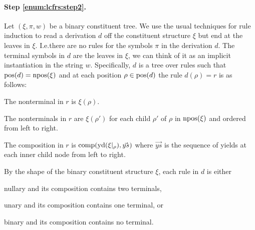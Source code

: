 \documentclass[../../document.tex]{subfiles}
\begin{document}
    \paragraph{Step \ref{enum:lcfrs:step2}.}
    Let \((\xi, \pi, w)\) be a binary constituent tree.
    We use the usual techniques for  rule induction to read a derivation \(d\) off the constituent structure \(\xi\) but end at the leaves in \(\xi\).
    I.e.\@ there are no rules for the  symbols \(\pi\) in the derivation \(d\).
    The terminal symbols in \(d\) are the leaves in \(\xi\), we can think of it as an implicit instantiation in the string \(w\).
    Specifically, \(d\) is a tree over  rules such that \(\operatorname{pos}(d) = \operatorname{npos}(\xi)\) and at each position \(\rho \in \operatorname{pos}(d)\) the rule \(d(\rho) = r\) is as follows:
    \begin{compactitem}
        \item The  nonterminal in \(r\) is \(\xi(\rho)\).
        \item The  nonterminals in \(r\) are \(\xi(\rho')\) for each child \(\rho'\) of \(\rho\) in \(\operatorname{npos}(\xi)\) and ordered from left to right.
        \item The composition in \(r\) is \(\mathrm{comp}(\operatorname{yd}(\xi|_\rho), \vec{ys})\) where \(\vec{ys}\) is the sequence of yields at each inner child node from left to right.
    \end{compactitem}
    By the shape of the binary constituent structure \(\xi\), each rule in \(d\) is either
    \begin{inparaitem}[]
        \item nullary and its composition contains two terminals,
        \item unary and its composition contains one terminal, or
        \item binary and its composition contains no terminal.
    \end{inparaitem}
\end{document}
